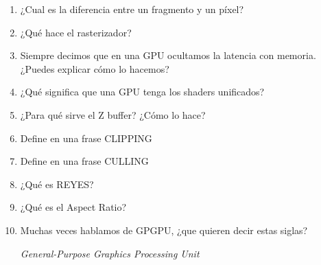 

\begin{enumerate}[label=(\alph*)]
    \item ¿Cual es la diferencia entre un fragmento y un píxel?
    \item ¿Qué hace el rasterizador?
    \item Siempre decimos que en una GPU ocultamos la latencia con memoria. ¿Puedes explicar cómo lo hacemos?
    \item ¿Qué significa que una GPU tenga los shaders unificados?
    \item ¿Para qué sirve el Z buffer? ¿Cómo lo hace?
    \item Define en una frase CLIPPING
    \item Define en una frase CULLING
    \item ¿Qué es REYES?
    \item ¿Qué es el Aspect Ratio?
    \item Muchas veces hablamos de GPGPU, ¿que quieren decir estas siglas?

    \emph{General-Purpose Graphics Processing Unit}

\end{enumerate}

